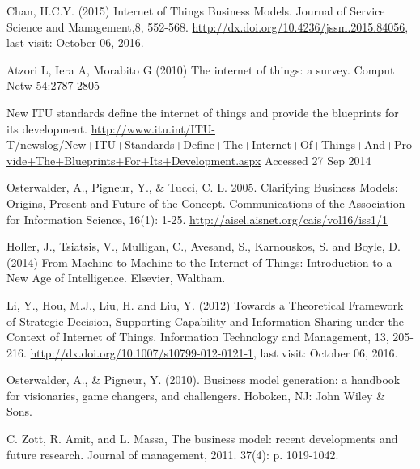 \begin{thebibliography}{99}
	 Chan, H.C.Y. (2015) Internet of Things Business Models. Journal of Service Science and Management,8, 552-568. \url{http://dx.doi.org/10.4236/jssm.2015.84056}, last visit: October 06, 2016.

	 Atzori L, Iera A, Morabito G (2010) The internet of things: a survey. Comput Netw 54:2787-2805 

	 New ITU standards define the internet of things and provide the blueprints for its development. \url{http://www.itu.int/ITU-T/newslog/New+ITU+Standards+Define+The+Internet+Of+Things+And+Provide+The+Blueprints+For+Its+Development.aspx} Accessed 27 Sep 2014 
	
	 Osterwalder, A., Pigneur, Y., \& Tucci, C. L. 2005. Clarifying Business Models: Origins, Present and Future of the Concept. Communications of the Association for Information Science, 16(1): 1-25. \url{http://aisel.aisnet.org/cais/vol16/iss1/1}

	 Holler, J., Tsiatsis, V., Mulligan, C., Avesand, S., Karnouskos, S. and Boyle, D. (2014) From Machine-to-Machine to the Internet of Things: Introduction to a New Age of Intelligence. Elsevier, Waltham.

	 Li, Y., Hou, M.J., Liu, H. and Liu, Y. (2012) Towards a Theoretical Framework of Strategic Decision, Supporting Capability and Information Sharing under the Context of Internet of Things. Information Technology and Management, 13, 205-216. \url{http://dx.doi.org/10.1007/s10799-012-0121-1}, last visit: October 06, 2016.

	 Osterwalder, A., \& Pigneur, Y. (2010). Business model generation: a handbook for visionaries, game changers, and challengers. Hoboken, NJ: John Wiley \& Sons. 

	  C. Zott, R. Amit, and L. Massa, The business model: recent developments and future research. Journal of management, 2011. 37(4): p. 1019-1042. 
 
 \end{thebibliography}

